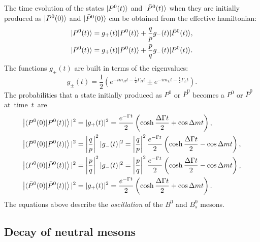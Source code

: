The time evolution of the states $|P^0(t)\rangle$ and $|\bar P^0(t)\rangle$ when they are initially produced as $|P^0(0)\rangle$ and $|\bar P^0(0)\rangle$ can be obtained from the effective hamiltonian:
\begin{align}
	|P^0(t)\rangle &= g_+(t) |P^0(t)\rangle + \frac{q}{p} g_-(t) |\bar P^0(t)\rangle, \\
	|\bar P^0(t)\rangle &= g_+(t) |\bar P^0(t)\rangle + \frac{p}{q} g_-(t) |P^0(t)\rangle.
\end{align}
The functions $g_{\pm}(t)$ are built in terms of the eigenvalues:
\begin{equation}
	g_{\pm}(t) = \frac{1}{2} \left( e^{-im_H t-\frac{1}{2}\Gamma_H t} \pm e^{-im_L t-\frac{1}{2}\Gamma_L t} \right).
\end{equation}
The probabilities that a state initially produced as $P^0$ or $\bar P^0$  becomes a $P^0$ or $\bar P^0$ at~time~$t$~are
\begin{align}
	\left| \langle P^0(0) | P^0(t) |\right\rangle|^2 &= |g_+(t)|^2 = \frac{e^{-\Gamma t}}{2} \left( \cosh\frac{\Delta\Gamma t}{2} + \cos\Delta m t \right), \\
	\label{eq:P0barToP0}
	\left| \langle \bar P^0(0) | P^0(t) |\right\rangle|^2 &= \left| \frac{q}{p} \right|^2 |g_-(t)|^2 = \left| \frac{q}{p} \right|^2 \frac{e^{-\Gamma t}}{2} \left( \cosh\frac{\Delta\Gamma t}{2} - \cos\Delta m t \right), \\
	\label{eq:P0ToP0bar}
	\left| \langle P^0(0) | \bar P^0(t) |\right\rangle|^2 &= \left| \frac{p}{q} \right|^2 |g_-(t)|^2 = \left| \frac{p}{q} \right|^2 \frac{e^{-\Gamma t}}{2} \left( \cosh\frac{\Delta\Gamma t}{2} - \cos\Delta m t \right), \\
	\left| \langle \bar P^0(0) | \bar P^0(t) |\right\rangle|^2 &= |g_+(t)|^2 = \frac{e^{-\Gamma t}}{2} \left( \cosh\frac{\Delta\Gamma t}{2} + \cos\Delta m t \right).
\end{align}
The equations above describe the \emph{oscillation} of the $B^0$ and $B^0_s$ mesons.

\subsection{Decay of neutral mesons}
\label{sec:neutral_meson_decays}

